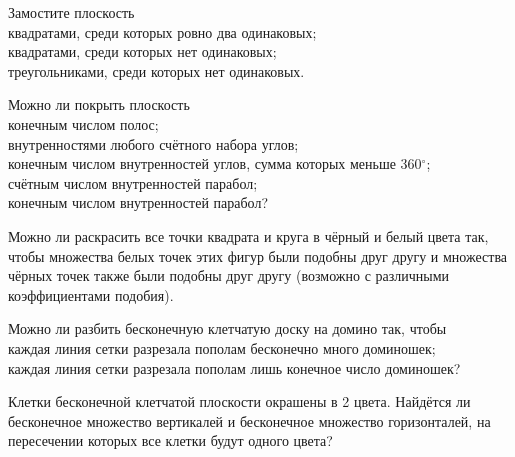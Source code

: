 \documentclass[a4paper,12pt]{article}
\begin{document}

Замостите плоскость \\
квадратами, среди которых ровно два одинаковых;\\
квадратами, среди которых нет одинаковых;\\
 треугольниками, среди которых нет одинаковых.

 Можно ли покрыть плоскость\\
   конечным числом полос;\\
 внутренностями любого счётного набора углов;\\
 конечным числом внутренностей углов, сумма которых
меньше 360$^\circ$;\\
 счётным числом внутренностей парабол;\\
 конечным числом внутренностей парабол?




%

Можно ли раскрасить все точки квадрата и круга в чёрный и белый цвета так, чтобы множества белых точек
этих фигур были подобны друг другу и множества чёрных точек также были подобны друг другу (возможно с
различными коэффициентами подобия).



Можно ли разбить бесконечную клетчатую доску на домино так, чтобы\\
 каждая линия сетки разрезала пополам бесконечно много доминошек; \\
 каждая линия сетки разрезала пополам лишь конечное число доминошек?


Клетки бесконечной клетчатой плоскости окрашены в 2 цвета.
Найдётся ли бесконечное множество вертикалей и
бесконечное множество горизонталей, на пересечении которых
все клетки будут одного цвета?
\end{document}
